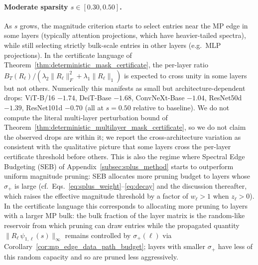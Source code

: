 \documentclass[11pt]{article}
\theoremstyle{plain}
\theoremstyle{definition}
\theoremstyle{remark}
\newcommand{\1}{\mathbf{1}}
\begin{document}
\paragraph{Moderate sparsity \(s\in[0.30,0.50]\).}  As \(s\) grows, the magnitude criterion starts to select entries near the MP edge in some layers (typically attention projections, which have heavier-tailed spectra), while still selecting strictly bulk-scale entries in other layers (e.g.\ MLP projections).  In the certificate language of Theorem~\ref{thm:deterministic_mask_certificate}, the per-layer ratio \(B_T(R_\ell)/(\lambda_2\|R_\ell\|_F^2+\lambda_1\|R_\ell\|_1)\) is expected to cross unity in some layers but not others.  Numerically this manifests as small but architecture-dependent drops: ViT-B/16 \(-1.74\), DeiT-Base \(-1.68\), ConvNeXt-Base \(-1.04\), ResNet50d \(-1.39\), ResNet101d \(-0.70\) (all at \(s=0.50\) relative to baseline).  We do not compute the literal multi-layer perturbation bound of Theorem~\ref{thm:deterministic_multilayer_mask_certificate}, so we do not claim the observed drops are within it; we report the cross-architecture variation as consistent with the qualitative picture that some layers cross the per-layer certificate threshold before others.  This is also the regime where Spectral Edge Budgeting (SEB) of Appendix~\ref{subsec:splus_method} starts to outperform uniform magnitude pruning: SEB allocates more pruning budget to layers whose \(\sigma_+\) is large (cf.\ Eqs.~\ref{eq:splus_weight}--\ref{eq:decay} and the discussion thereafter, which raises the effective magnitude threshold by a factor of \(w_\ell>1\) when \(z_\ell>0\)).  In the certificate language this corresponds to allocating more pruning to layers with a larger MP bulk: the bulk fraction of the layer matrix is the random-like reservoir from which pruning can draw entries while the propagated quantity \(\|R_\ell\,\psi_{1,\ell}(s)\|_\infty\) remains controlled by \(\sigma_+(\ell)\) via Corollary~\ref{cor:mp_edge_data_path_budget}; layers with smaller \(\sigma_+\) have less of this random capacity and so are pruned less aggressively.
\end{document}
